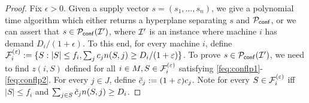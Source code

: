 \begin{proof}
	Fix $\epsilon> 0$.
	Given a supply vector $s = (s_1,\ldots,s_n)$, we give a polynomial time algorithm which either returns a hyperplane separating $s$ and ${\cal P}_\mathsf{conf}$, or we can assert that
	$s\in {\cal P}_\mathsf{conf}({\cal I}')$, where ${\cal I}'$ is an instance where machine $i$ has demand $D_i/(1+\epsilon)$. To this end, for every machine $i$, define ${\cal F}^{(\varepsilon)}_i := \{S: |S| \leq f_i,  \sum_j c_jn(S,j)\geq D_i/(1+\varepsilon) \}$. To prove $s\in {\cal P}_\mathsf{conf}({\cal I}')$, we need to find $z(i,S)$ defined for all $i\in M, S\in {\cal F}^{(\varepsilon)}_i$ satisfying \eqref{feq:conflp1}-\eqref{feq:conflp2}.
	For every $j\in J$, define $\tilde{c}_j := (1+\varepsilon)c_j$. Note for every $S\in {\cal F}^{(\varepsilon)}_i$ iff $|S| \leq f_i$ and  $\sum_{j\in S} \tilde{c}_j n(S,j) \geq D_i$.
	

\end{proof}
